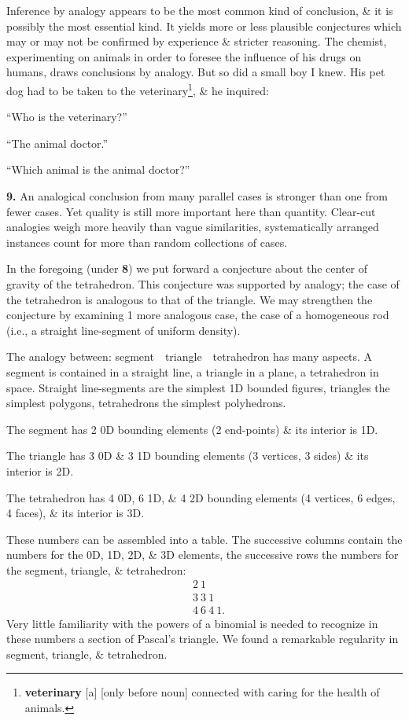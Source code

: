 \documentclass[oneside]{book}
\numberwithin{equation}{section}
\begin{document}
Inference by analogy appears to be the most common kind of conclusion, \& it is possibly the most essential kind. It yields more or less plausible conjectures which may or may not be confirmed by experience \& stricter reasoning. The chemist, experimenting on animals in order to foresee the influence of his drugs on humans, draws conclusions by analogy. But so did a small boy I knew. His pet dog had to be taken to the veterinary\footnote{\textbf{veterinary} [a] [only before noun] connected with caring for the health of animals.}, \& he inquired:

``Who is the veterinary?''

``The animal doctor.''

``Which animal is the animal doctor?''

\textbf{9.} An analogical conclusion from many parallel cases is stronger than one from fewer cases. Yet quality is still more important here than quantity. Clear-cut analogies weigh more heavily than vague similarities, systematically arranged instances count for more than random collections of cases.

In the foregoing (under \textbf{8}) we put forward a conjecture about the center of gravity of the tetrahedron. This conjecture was supported by analogy; the case of the tetrahedron is analogous to that of the triangle. We may strengthen the conjecture by examining 1 more analogous case, the case of a homogeneous rod (i.e., a straight line-segment of uniform density).

The analogy between: segment\ \ triangle\ \ tetrahedron has many aspects. A segment is contained in a straight line, a triangle in a plane, a tetrahedron in space. Straight line-segments are the simplest 1D bounded figures, triangles the simplest polygons, tetrahedrons the simplest polyhedrons.

The segment has 2 0D bounding elements (2 end-points) \& its interior is 1D.

The triangle has 3 0D \& 3 1D bounding elements (3 vertices, 3 sides) \& its interior is 2D.

The tetrahedron has 4 0D, 6 1D, \& 4 2D bounding elements (4 vertices, 6 edges, 4 faces), \& its interior is 3D.

These numbers can be assembled into a table. The successive columns contain the numbers for the 0D, 1D, 2D, \& 3D elements, the successive rows the numbers for the segment, triangle, \& tetrahedron:
\begin{align*}
	&2\ 1\\
	&3\ 3\ 1\\
	&4\ 6\ 4\ 1.
\end{align*}
Very little familiarity with the powers of a binomial is needed to recognize in these numbers a section of Pascal's triangle. We found a remarkable regularity in segment, triangle, \& tetrahedron.
\end{document}
